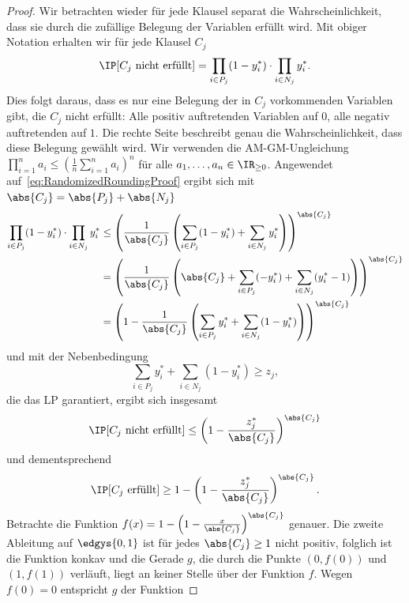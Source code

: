 \documentclass[language=ngerman,algolist]{TemplateLecture}
\begin{document}
\begin{proof}
    Wir betrachten wieder für jede Klausel separat die Wahrscheinlichkeit, dass sie durch die zufällige Belegung der Variablen erfüllt wird. Mit obiger Notation erhalten wir für jede Klausel $C_j$
    \begin{equation}
        \IP[\text{$C_j$ nicht erfüllt}] = \prod_{i \in P_j} (1 - y_i^*) \cdot \prod_{i \in N_j} y_i^*.\label{eq:RandomizedRoundingProof}
    \end{equation}
    Dies folgt daraus, dass es nur eine Belegung der in $C_j$ vorkommenden Variablen gibt, die $C_j$ nicht erfüllt: Alle positiv auftretenden Variablen auf $0$, alle negativ auftretenden auf $1$. Die rechte Seite beschreibt genau die Wahrscheinlichkeit, dass diese Belegung gewählt wird. Wir verwenden die AM-GM-Ungleichung $\prod_{i=1}^n a_i \leq \left( \frac{1}{n} \sum_{i = 1}^n a_i \right)^n$ für alle $a_1, \ldots, a_n \in \IR_{\geq 0}$. Angewendet auf~\eqref{eq:RandomizedRoundingProof} ergibt sich mit $\abs{C_j} = \abs{P_j} + \abs{N_j}$
    \begin{equation*}
        \begin{split}
            \prod_{i \in P_j} (1 - y_i^*) \cdot \prod_{i \in N_j} y_i^* &\leq \left( \frac{1}{\abs{C_j}} \left( \sum_{i \in P_j} (1 - y_i^*) + \sum_{i \in N_j} y_i^* \right) \right)^{\abs{C_j}} \\
            &= \left( \frac{1}{\abs{C_j}}\left( \abs{C_j} + \sum_{i \in P_j} (-y_i^*) + \sum_{i \in N_j}(y_i^* - 1) \right) \right)^{\abs{C_j}} \\
            &= \left( 1 - \frac{1}{\abs{C_j}} \left( \sum_{i \in P_j} y_i^* + \sum_{i \in N_j} (1 - y_i^*) \right) \right)^{\abs{C_j}}
        \end{split}
    \end{equation*}
    und mit der Nebenbedingung 
    \begin{equation*}
        \sum_{i \in P_j} y_i^* + \sum_{i \in N_j}(1 - y_i^*) \geq z_j,
    \end{equation*}
    die das LP garantiert, ergibt sich insgesamt 
    \begin{equation*}
        \IP[\text{$C_j$ nicht erfüllt}] \leq \left( 1 - \frac{z_j^*}{\abs{C_j}} \right)^{\abs{C_j}}
    \end{equation*}
    und dementsprechend
    \begin{equation*}
        \IP[\text{$C_j$ erfüllt}] \geq 1 - \left( 1 - \frac{z_j^*}{\abs{C_j}} \right)^{\abs{C_j}}.
    \end{equation*}
    Betrachte die Funktion $f(x) = 1 - \left( 1 - \frac{x}{\abs{C_j}} \right)^{\abs{C_j}}$ genauer. Die zweite Ableitung auf $\edgys{0,1}$ ist für jedes $\abs{C_j} \geq 1$ nicht positiv, folglich ist die Funktion konkav und die Gerade $g$, die durch die Punkte $(0, f(0))$ und $(1, f(1))$ verläuft, liegt an keiner Stelle über der Funktion $f$. Wegen $f(0) = 0$ entspricht $g$ der Funktion

\end{proof}
\end{document}
